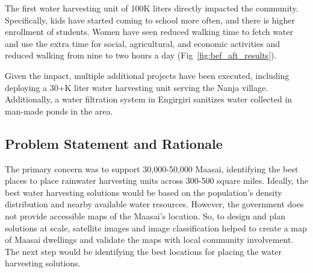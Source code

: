 \documentclass[10pt]{article}
\begin{document}
The first water harvesting unit of 100K liters directly impacted the community. Specifically, kids have started coming to school more often, and there is higher enrollment of students. Women have seen reduced walking time to fetch water and use the extra time for social, agricultural, and economic activities and reduced walking from nine to two hours a day (Fig~\ref{fig:bef_aft_results}). 

Given the impact, multiple additional projects have been executed, including deploying a 30+K liter water harvesting unit serving the Nanja village. Additionally, a water filtration system in Engirgiri sanitizes water collected in man-made ponds in the area.




\subsection{Problem Statement and Rationale}


The primary concern was to support 30,000-50,000 Maasai, identifying the best places to place rainwater harvesting units across 300-500 square miles. Ideally, the best water harvesting solutions would be based on the population's density distribution and nearby available water resources. However, the government does not provide accessible maps of the Maasai's location. So, to design and plan solutions at scale, satellite images and image classification helped to create a map of Maasai dwellings and validate the maps with local community involvement. The next step would be identifying the best locations for placing the water harvesting solutions.



\end{document}

